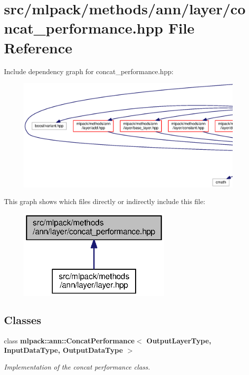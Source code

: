 \section{src/mlpack/methods/ann/layer/concat\+\_\+performance.hpp File Reference}
\label{concat__performance_8hpp}
Include dependency graph for concat\+\_\+performance.\+hpp\+:
\nopagebreak
\begin{figure}[H]
\begin{center}
\leavevmode
\includegraphics[width=350pt]{concat__performance_8hpp__incl}
\end{center}
\end{figure}
This graph shows which files directly or indirectly include this file\+:
\nopagebreak
\begin{figure}[H]
\begin{center}
\leavevmode
\includegraphics[width=214pt]{concat__performance_8hpp__dep__incl}
\end{center}
\end{figure}
\subsection*{Classes}
\begin{DoxyCompactItemize}
\item 
class {\bf mlpack\+::ann\+::\+Concat\+Performance$<$ Output\+Layer\+Type, Input\+Data\+Type, Output\+Data\+Type $>$}
\begin{DoxyCompactList}\small\item\em Implementation of the concat performance class. \end{DoxyCompactList}\end{DoxyCompactItemize}
